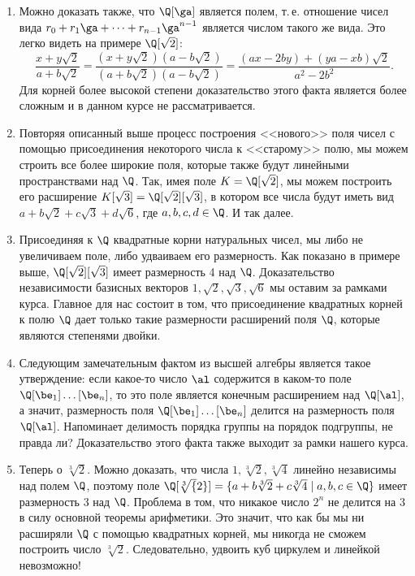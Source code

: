 \begin{enumerate}
\item Можно доказать также, что $\Q[\ga]$ является полем, т.\,е. отношение чисел вида $r_0+r_1\ga+\dots+r_{n-1}\ga^{n-1}$ является числом такого же вида. Это легко видеть на примере $\Q[\sqrt 2]$:
$$
\frac{x+y\sqrt 2}{a+b\sqrt 2}=\frac{(x+y\sqrt 2)(a-b\sqrt 2)}{(a+b\sqrt 2)(a-b\sqrt 2)}=
\frac{(ax-2by)+(ya-xb)\sqrt 2}{a^2-2b^2}.
$$
Для корней более высокой степени доказательство этого факта является более сложным и в данном курсе не рассматривается.

\item Повторяя описанный выше процесс построения <<нового>> поля чисел с помощью присоединения некоторого числа к <<старому>> полю, мы можем строить все более широкие поля, которые также будут линейными пространствами над $\Q$. Так, имея поле $K=\Q[\sqrt 2]$, мы можем построить его расширение $K[\sqrt 3]=\Q[\sqrt 2][\sqrt 3]$, в котором все числа будут иметь вид $a+b\sqrt 2+c\sqrt 3+d\sqrt 6$, где $a,b,c,d\in\Q$. И так далее.

\item Присоединяя к $\Q$ квадратные корни натуральных чисел, мы либо не увеличиваем поле, либо удваиваем его размерность. Как показано в примере выше, $\Q[\sqrt 2][\sqrt 3]$ имеет размерность 4 над $\Q$. Доказательство независимости базисных векторов $1,\sqrt 2,\sqrt 3,\sqrt 6$ мы оставим за рамками курса. Главное для нас состоит в том, что присоединение квадратных корней к полю $\Q$ дает только такие размерности расширений поля $\Q$, которые являются степенями двойки.


\item Следующим замечательным фактом из высшей алгебры является такое утверждение: если какое-то число $\al$ содержится в каком-то поле $\Q[\be_1]\dots[\be_n]$, то это поле является конечным расширением над $\Q[\al]$, а значит, размерность поля $\Q[\be_1]\dots[\be_n]$ делится на размерность поля $\Q[\al]$. Напоминает делимость порядка группы на порядок подгруппы, не правда ли? Доказательство этого факта также выходит за рамки нашего курса.

\item Теперь о $\sqrt[3]{2}$. Можно доказать, что числа $1,\sqrt[3]{2},\sqrt[3]{4}$ линейно независимы над полем $\Q$, поэтому поле $\Q[\sqrt[3]{2}]=\{a+b\sqrt[3]{2}+c\sqrt[3]{4}\mid a,b,c\in\Q\}$ имеет размерность 3 над $\Q$. Проблема в том, что никакое число $2^n$ не делится на 3 в силу основной теоремы арифметики. Это значит, что как бы мы ни расширяли $\Q$ с помощью квадратных корней, мы никогда не сможем построить число $\sqrt[3]{2}$. Следовательно, удвоить куб циркулем и линейкой невозможно!
\end{enumerate}







